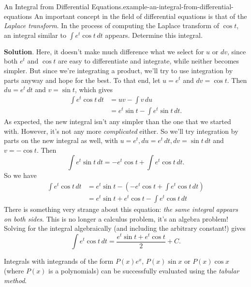 \documentclass[10pt,]{book}
\numberwithin{equation}{section}
\begin{document}
\begin{example}{An Integral from Differential Equations.}{example-an-integral-from-differential-equations}%
\hypertarget{p-509}{}%
An important concept in the field of differential equations is that of the \emph{Laplace transform}. In the process of computing the Laplace transform of \(\cos t\), an integral similar to \(\int e^{t}\cos t\,dt\) appears. Determine this integral.%
\par\smallskip%
\noindent\textbf{Solution}.\hypertarget{solution-112}{}\quad%
\hypertarget{p-510}{}%
Here, it doesn't make much difference what we select for \(u\) or \(dv\), since both \(e^{t}\) and \(\cos t\) are easy to differentiate and integrate, while neither becomes simpler. But since we're integrating a product, we'll try to use integration by parts anyway and hope for the best. To that end, let \(u = e^{t}\) and \(dv = \cos t\). Then \(du = e^{t}\,dt\) and \(v = \sin t\), which gives%
%
\begin{align*}
\int e^{t}\cos t\,dt & = uv - \int v\,du \\
& = e^{t}\sin t - \int e^{t}\sin t\,dt. 
\end{align*}
\hypertarget{p-511}{}%
As expected, the new integral isn't any simpler than the one that we started with. However, it's not any more \emph{complicated} either. So we'll try integration by parts on the new integral as well, with \(u = e^{t}, du = e^{t}\,dt, dv = \sin t\,dt\) and \(v = -\cos t\). Then%
%
\begin{equation*}
\int e^{t}\sin t\,dt = -e^{t}\cos t + \int e^{t}\cos t\,dt.
\end{equation*}
\hypertarget{p-512}{}%
So we have%
%
\begin{align*}
\int e^{t}\cos t\,dt & = e^{t}\sin t - (-e^{t}\cos t + \int e^{t}\cos t\,dt) \\
& = e^{t}\sin t + e^{t}\cos t - \int e^{t}\cos t\,dt 
\end{align*}
\hypertarget{p-513}{}%
There is something very strange about this equation: \emph{the same integral appears on both sides}. This is no longer a calculus problem, it's an algebra problem! Solving for the integral algebraically (and including the arbitrary constant!) gives%
\begin{equation*}
\int e^{t}\cos t\,dt = \frac{e^{t}\sin t + e^{t}\cos t}{2} + C.
\end{equation*}
%
\end{example}
\hypertarget{p-514}{}%
Integrals with integrands of the form \(P(x)e^{x}\), \(P(x)\sin x\) or \(P(x)\cos x\) (where \(P(x)\) is a polynomials) can be successfully evaluated using the \emph{tabular method}.%
\end{document}
